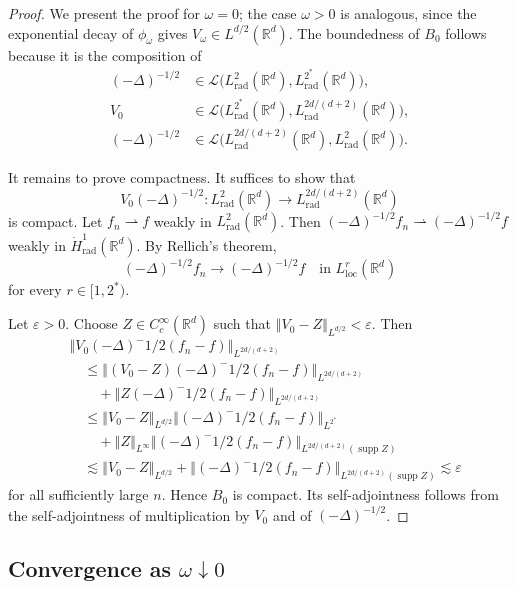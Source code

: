 \documentclass[12pt, a4paper, reqno]{amsart}
\numberwithin{equation}{section}
\theoremstyle{definition}
\theoremstyle{remark}
\newcommand{\R}{\mathbb R}
\def\norm[#1]{{\left\Vert #1 \right\Vert}}
\newcommand{\rad}{\mathrm{rad}}
\begin{document}
\begin{proof}
We present the proof for $\omega=0$; the case $\omega>0$ is analogous,
since the exponential decay of $\phi_\omega$ gives
$V_\omega\in L^{d/2}(\R^d)$.
The boundedness of $B_0$ follows because it is the composition of
\begin{align*}
  (-\Delta)^{-1/2}
  &\in\mathcal{L}\bigl(
    L^2_{\rad}(\R^d),L^{2^*}_{\rad}(\R^d)
  \bigr),
  \\
  V_0
  &\in\mathcal{L}\bigl(
    L^{2^*}_{\rad}(\R^d),L^{2d/(d+2)}_{\rad}(\R^d)
  \bigr),
  \\
  (-\Delta)^{-1/2}
  &\in\mathcal{L}\bigl(
    L^{2d/(d+2)}_{\rad}(\R^d),L^2_{\rad}(\R^d)
  \bigr).
\end{align*}

It remains to prove compactness. It suffices to show that
\[
  V_0(-\Delta)^{-1/2}
  \colon L^2_{\rad}(\R^d)\to L^{2d/(d+2)}_{\rad}(\R^d)
\]
is compact. Let $f_n\rightharpoonup f$ weakly in $L^2_{\rad}(\R^d)$. Then
$(-\Delta)^{-1/2}f_n\rightharpoonup(-\Delta)^{-1/2}f$ weakly in
$\dot H^1_{\rad}(\R^d)$. By Rellich's theorem,
\[
  (-\Delta)^{-1/2}f_n
  \to(-\Delta)^{-1/2}f
  \quad\text{in }L^r_{\mathrm{loc}}(\R^d)
\]
for every $r\in[1,2^*)$.

Let $\varepsilon>0$. Choose $Z\in C_c^\infty(\R^d)$ such that
$\norm[V_0-Z]_{L^{d/2}}<\varepsilon$. Then
\begin{align*}
  &\norm[
    V_0(-\Delta)^{-1/2}(f_n-f)
  ]_{L^{2d/(d+2)}}
  \\
  &\quad\le
  \norm[
    (V_0-Z)(-\Delta)^{-1/2}(f_n-f)
  ]_{L^{2d/(d+2)}}
  \\
  &\quad\quad+
  \norm[
    Z(-\Delta)^{-1/2}(f_n-f)
  ]_{L^{2d/(d+2)}}
  \\
  &\quad\le
  \norm[V_0-Z]_{L^{d/2}}
  \norm[(-\Delta)^{-1/2}(f_n-f)]_{L^{2^*}}
  \\
  &\quad\quad+
  \norm[Z]_{L^\infty}
  \norm[
    (-\Delta)^{-1/2}(f_n-f)
  ]_{L^{2d/(d+2)}(\operatorname{supp}Z)}
  \\
  &\quad\lesssim
  \norm[V_0-Z]_{L^{d/2}}
  +\norm[
    (-\Delta)^{-1/2}(f_n-f)
  ]_{L^{2d/(d+2)}(\operatorname{supp}Z)}
  \lesssim\varepsilon
\end{align*}
for all sufficiently large $n$. Hence $B_0$ is compact. Its
self-adjointness follows from the self-adjointness of multiplication by
$V_0$ and of $(-\Delta)^{-1/2}$.
\end{proof}

\subsection{\texorpdfstring{Convergence as $\omega\downarrow0$}{Convergence as omega tends to zero}}
\end{document}
